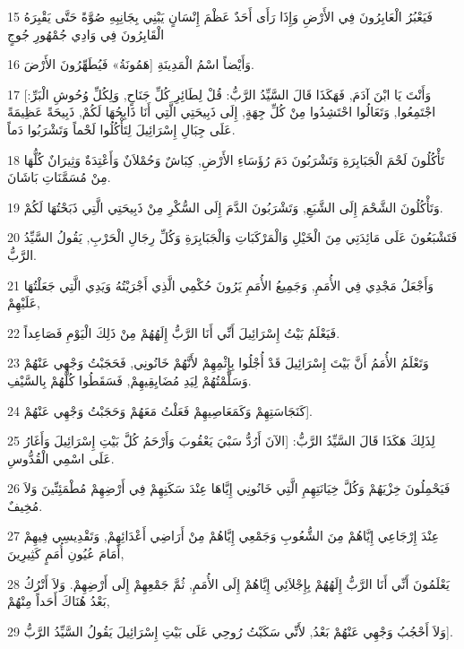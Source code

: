\par 15 فَيَعْبُرُ الْعَابِرُونَ فِي الأَرْضِ وَإِذَا رَأَى أَحَدٌ عَظْمَ إِنْسَانٍ يَبْنِي بِجَانِبِهِ صُوَّةً حَتَّى يَقْبِرَهُ الْقَابِرُونَ فِي وَادِي جُمْهُورِ جُوجٍ
\par 16 وَأَيْضاً اسْمُ الْمَدِينَةِ [هَمُونَةُ» فَيُطَهِّرُونَ الأَرْضَ.
\par 17 [وَأَنْتَ يَا ابْنَ آدَمَ, فَهَكَذَا قَالَ السَّيِّدُ الرَّبُّ: قُلْ لِطَائِرِ كُلِّ جَنَاحٍ, وَلِكُلِّ وُحُوشِ الْبَرِّ: اجْتَمِعُوا, وَتَعَالُوا احْتَشِدُوا مِنْ كُلِّ جِهَةٍ, إِلَى ذَبِيحَتِي الَّتِي أَنَا ذَابِحُهَا لَكُمْ, ذَبِيحَةً عَظِيمَةً عَلَى جِبَالِ إِسْرَائِيلَ لِتَأْكُلُوا لَحْماً وَتَشْرَبُوا دَماً.
\par 18 تَأْكُلُونَ لَحْمَ الْجَبَابِرَةِ وَتَشْرَبُونَ دَمَ رُؤَسَاءِ الأَرْضِ, كِبَاشٌ وَحُمْلاَنٌ وَأَعْتِدَةٌ وَثِيرَانٌ كُلُّهَا مِنْ مُسَمَّنَاتِ بَاشَانَ.
\par 19 وَتَأْكُلُونَ الشَّحْمَ إِلَى الشَّبَعِ, وَتَشْرَبُونَ الدَّمَ إِلَى السُّكْرِ مِنْ ذَبِيحَتِي الَّتِي ذَبَحْتُهَا لَكُمْ.
\par 20 فَتَشْبَعُونَ عَلَى مَائِدَتِي مِنَ الْخَيْلِ وَالْمَرْكَبَاتِ وَالْجَبَابِرَةِ وَكُلِّ رِجَالِ الْحَرْبِ, يَقُولُ السَّيِّدُ الرَّبُّ.
\par 21 وَأَجْعَلُ مَجْدِي فِي الأُمَمِ, وَجَمِيعُ الأُمَمِ يَرُونَ حُكْمِي الَّذِي أَجْرَيْتُهُ وَيَدِي الَّتِي جَعَلْتُهَا عَلَيْهِمْ,
\par 22 فَيَعْلَمُ بَيْتُ إِسْرَائِيلَ أَنِّي أَنَا الرَّبُّ إِلَهُهُمْ مِنْ ذَلِكَ الْيَوْمِ فَصَاعِداً.
\par 23 وَتَعْلَمُ الأُمَمُ أَنَّ بَيْتَ إِسْرَائِيلَ قَدْ أُجْلُوا بِإِثْمِهِمْ لأَنَّهُمْ خَانُونِي, فَحَجَبْتُ وَجْهِي عَنْهُمْ وَسَلَّمْتُهُمْ لِيَدِ مُضَايِقِيهِمْ, فَسَقَطُوا كُلُّهُمْ بِالسَّيْفِ.
\par 24 كَنَجَاسَتِهِمْ وَكَمَعَاصِيهِمْ فَعَلْتُ مَعَهُمْ وَحَجَبْتُ وَجْهِي عَنْهُمْ].
\par 25 لِذَلِكَ هَكَذَا قَالَ السَّيِّدُ الرَّبُّ: [الآنَ أَرُدُّ سَبْيَ يَعْقُوبَ وَأَرْحَمُ كُلَّ بَيْتِ إِسْرَائِيلَ وَأَغَارُ عَلَى اسْمِي الْقُدُّوسِ.
\par 26 فَيَحْمِلُونَ خِزْيَهُمْ وَكُلَّ خِيَانَتِهِمِ الَّتِي خَانُونِي إِيَّاهَا عِنْدَ سَكَنِهِمْ فِي أَرْضِهِمْ مُطْمَئِنِّينَ وَلاَ مُخِيفٌ.
\par 27 عِنْدَ إِرْجَاعِي إِيَّاهُمْ مِنَ الشُّعُوبِ وَجَمْعِي إِيَّاهُمْ مِنْ أَرَاضِي أَعْدَائِهِمْ, وَتَقْدِيسِي فِيهِمْ أَمَامَ عُيُونِ أُمَمٍ كَثِيرِينَ,
\par 28 يَعْلَمُونَ أَنِّي أَنَا الرَّبُّ إِلَهُهُمْ بِإِجْلاَئِي إِيَّاهُمْ إِلَى الأُمَمِ, ثُمَّ جَمْعِهِمْ إِلَى أَرْضِهِمْ. وَلاَ أَتْرُكُ بَعْدُ هُنَاكَ أَحَداً مِنْهُمْ,
\par 29 وَلاَ أَحْجُبُ وَجْهِي عَنْهُمْ بَعْدُ, لأَنِّي سَكَبْتُ رُوحِي عَلَى بَيْتِ إِسْرَائِيلَ يَقُولُ السَّيِّدُ الرَّبُّ].

